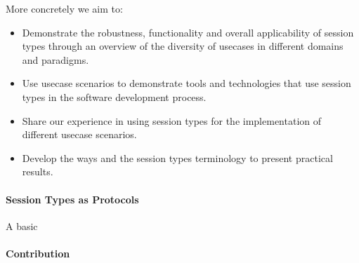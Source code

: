 More concretely we aim to:
\begin{itemize}
	\item	Demonstrate the robustness, functionality and overall applicability of session types
			through an overview of the diversity of usecases in different domains
			and paradigms.

	\item	Use usecase scenarios to demonstrate tools and technologies that
			use session types in the software development process.

	\item	Share our experience in using session types for the
			implementation of different usecase scenarios.

	\item	Develop the ways and the session types terminology to
			present practical results.
\end{itemize}

\paragraph{Session Types as Protocols}
A basic 

\paragraph{Contribution}




